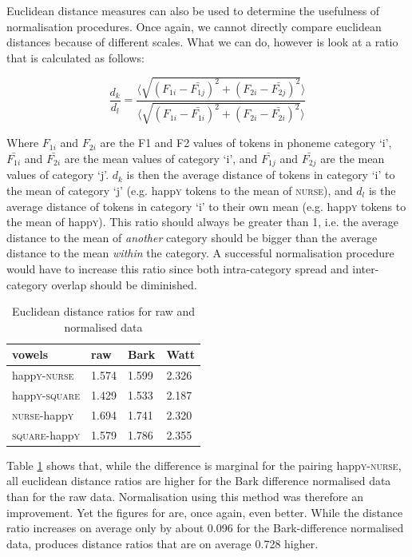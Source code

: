 Euclidean distance measures can also be used to determine the usefulness of normalisation procedures. Once again, we cannot directly compare euclidean distances because of different scales. What we can do, however is look at a ratio that is calculated as follows:

\begin{equation}
	\frac{d_{k}}{d_{l}} = \frac{\langle\sqrt{(F_{1i} - \bar{F_{1j}})^2 + (F_{2i} - \bar{F_{2j}})^2}\rangle}
	{\langle\sqrt{(F_{1i} - \bar{F_{1i}})^2 + (F_{2i} - \bar{F_{2i}})^2}\rangle}
\end{equation}

Where \(F_{1i}\) and \(F_{2i}\) are the F1 and F2 values of tokens in phoneme category `i', \(\bar{F_{1i}}\) and \(\bar{F_{2i}}\) are the mean values of category `i', and \(\bar{F_{1j}}\) and \(\bar{F_{2j}}\) are the mean values of category `j'. \(d_{k}\) is then the average distance of tokens in category `i' to the mean of category `j' (e.g. happ\textsc{y} tokens to the mean of \textsc{nurse}), and \(d_{l}\) is the average distance of tokens in category `i' to their own mean (e.g. happ\textsc{y} tokens to the mean of happ\textsc{y}). This ratio should always be greater than 1, i.e. the average distance to the mean of \emph{another} category should be bigger than the average distance to the mean \emph{within} the category. A successful normalisation procedure would have to increase this ratio since both intra-category spread and inter-category overlap should be diminished.

\begin{table}[h]
	\centering
	\caption{Euclidean distance ratios for raw and normalised data}
	\begin{tabular}{llll}
		\hline
		vowels & raw & Bark & Watt\\
		\hline
		happ\textsc{y}-\textsc{nurse} &
		1.574 &
		1.599 &
		2.326 \\
		happ\textsc{y}-\textsc{square} &
		1.429 &
		1.533 &
		2.187 \\
		\textsc{nurse}-happ\textsc{y} &
		1.694 &
		1.741 &
		2.320 \\
		\textsc{square}-happ\textsc{y} &
		1.579 &
		1.786 &
		2.355 \\
		\hline
	\end{tabular}
	\label{tab.euclid}
\end{table}

Table \ref{tab.euclid} shows that, while the difference is marginal for the pairing happ\textsc{y}-\textsc{nurse}, all euclidean distance ratios are higher for the Bark difference normalised data than for the raw data.
Normalisation using this method was therefore an improvement.
Yet the figures for \citeauthor{wattfabricius2002} are, once again, even better.
While the distance ratio increases on average only by about 0.096 for the Bark-difference normalised data, \citeauthor{wattfabricius2002} produces distance ratios that are on average 0.728 higher.

